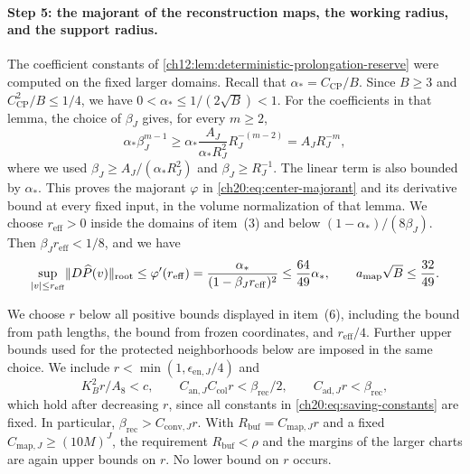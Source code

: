 \paragraph{Step 5: the majorant of the reconstruction maps, the working radius, and the support radius.}
The coefficient constants of \cref{ch12:lem:deterministic-prolongation-reserve} were computed on the fixed larger domains. Recall that $\alpha_*=C_{\mathrm{CP}}/B$. Since $B\ge3$ and $C_{\mathrm{CP}}^2/B\le1/4$, we have $0<\alpha_*\le1/(2\sqrt B)<1$. For the coefficients in that lemma, the choice of $\beta_J$ gives, for every $m\ge2$,
\[
 \alpha_*\beta_J^{m-1}\ge\alpha_*\frac{A_J}{\alpha_*R_J^2}R_J^{-(m-2)}=A_JR_J^{-m},
\]
where we used $\beta_J\ge A_J/(\alpha_*R_J^2)$ and $\beta_J\ge R_J^{-1}$. The linear term is also bounded by $\alpha_*$. This proves the majorant $\varphi$ in \eqref{ch20:eq:center-majorant} and its derivative bound at every fixed input, in the volume normalization of that lemma. We choose $r_{\mathrm{eff}}>0$ inside the domains of item~(3) and below $(1-\alpha_*)/(8\beta_J)$. Then $\beta_Jr_{\mathrm{eff}}<1/8$, and we have
\begin{equation}\label{ch20:eq:center-margin}
 \sup_{\lvert v\rvert\le r_{\mathrm{eff}}}\lVert D\widehat P(v)\rVert_{\mathrm{root}}\le\varphi'(r_{\mathrm{eff}})=\frac{\alpha_*}{(1-\beta_Jr_{\mathrm{eff}})^2}\le\frac{64}{49}\alpha_*,\qquad a_{\mathrm{map}}\sqrt B\le\frac{32}{49}.
\end{equation}

We choose $r$ below all positive bounds displayed in item~(6), including the bound from path lengths, the bound from frozen coordinates, and $r_{\mathrm{eff}}/4$. Further upper bounds used for the protected neighborhoods below are imposed in the same choice. We include $r<\min(1,\epsilon_{\mathrm{en},J}/4)$ and
\begin{equation}\label{ch20:eq:relative-collar-gates}
 K_B^2r/A_8<c,\qquad C_{\mathrm{an},J}C_{\mathrm{col}}r<\beta_{\mathrm{rec}}/2,\qquad C_{\mathrm{ad},J}r<\beta_{\mathrm{rec}},
\end{equation}
which hold after decreasing $r$, since all constants in \eqref{ch20:eq:saving-constants} are fixed. In particular, $\beta_{\mathrm{rec}}>C_{\mathrm{conv},J}r$. With $R_{\mathrm{buf}}=C_{\mathrm{map},J}r$ and a fixed $C_{\mathrm{map},J}\ge(10M)^J$, the requirement $R_{\mathrm{buf}}<\rho$ and the margins of the larger charts are again upper bounds on $r$. No lower bound on $r$ occurs.


